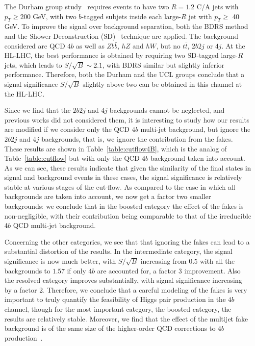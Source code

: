 The Durham group study~\cite{deLima:2014dta} requires events
to have two $R=1.2$ C/A jets with $p_T\ge 200$ GeV, with
two $b$-tagged subjets inside each large-$R$ jet with
$p_T \ge$ 40 GeV.
%
To improve the signal over background separation, both the BDRS
method and the Shower Deconstruction (SD)~\cite{Soper:2011cr,Soper:2012pb}
technique are applied.
%
The background considered are QCD $4b$ as well as $Zb\bar{b}$, $hZ$ and
$hW$, but no $t\bar{t}$, $2b2j$ or $4j$.
%
At the HL-LHC, the best performance is obtained by requiring two
SD-tagged large-$R$ jets, which leads to $S/\sqrt{B}\sim 2.1$,
with BDRS similar but slightly inferior performance.
%
Therefore, both the Durham and the UCL groups conclude that a signal
significance $S/\sqrt{B}$ slightly above two can  be obtained
in this channel at the HL-LHC.

Since we find that the $2b2j$ and $4j$ backgrounds cannot
be neglected, and previous works did not considered them,
it is interesting to
study how our results are modified if we consider only the QCD $4b$
multi-jet background, but ignore the $2b2j$ and $4j$ backgrounds,
that is, we ignore the contribution from the fakes.
%
These results are shown in
Table~\ref{table:cutflow4B}, which is the analog of
Table~\ref{table:cutflow} but with only the QCD
$4b$ background taken into account.
%
As we can see, these results indicate that given the similarity of the final states
in signal and background events in these cases, the signal significance is
relatively stable at various stages of the cut-flow.
%
As compared to the case in which all backgrounds are taken into account, we
now get a factor two smaller backgrounds: we conclude that in the boosted category
the effect of the fakes is non-negligible, with their contribution being
comparable to that of the irreducible $4b$ QCD multi-jet background.

Concerning the other categories, we see that that ignoring the fakes can lead to a substantial
distortion of the results.
%
In the intermediate category, the signal significance is now much better, with $S/\sqrt{B}$ increasing from
0.5 with all the backgrounds to $1.57$ if only $4b$ are accounted for, a factor 3 improvement.
%
Also the resolved category improves substantially, with signal significance increasing by a factor 2.
%
Therefore, we conclude that a careful modeling of the fakes is very important to truly quantify
the feasibility of Higgs pair production in the $4b$ channel, though for the most
important category, the boosted category, the results are relatively stable.
%
Moreover, we find that the effect of the multijet fake background is of
the same size of the higher-order QCD corrections to $4b$ production~\cite{Binoth:2009rv}.


